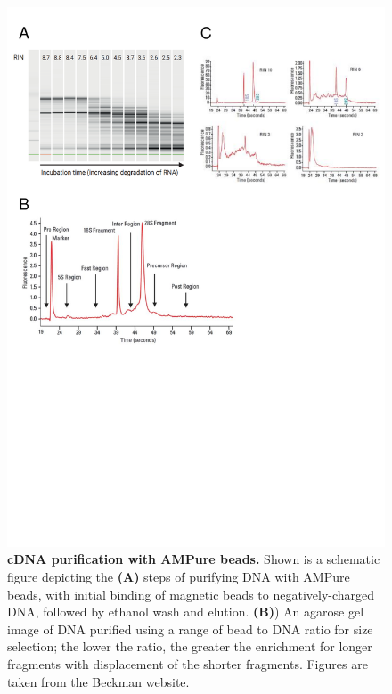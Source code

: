 \begin{figure}[!h]
	\centering
	\includegraphics[page=3,trim={0 8cm 0 0cm},clip, scale = 0.7]{Figures/General_Methodology_Figures.pdf}
	\captionsetup{width=0.95\textwidth}
	\caption[cDNA purification with AMPure beads]%
	{\textbf{cDNA purification with AMPure beads.} Shown is a schematic figure depicting the \textbf{(A)} steps of purifying DNA with AMPure beads, with initial binding of magnetic beads to negatively-charged DNA, followed by ethanol wash and elution. \textbf{(B)}) An agarose gel image of DNA purified using a range of bead to DNA ratio for size selection; the lower the ratio, the greater the enrichment for longer fragments with displacement of the shorter fragments. Figures are taken from the Beckman website.}
	\label{fig:ampure_bead_workflow}
\end{figure}

